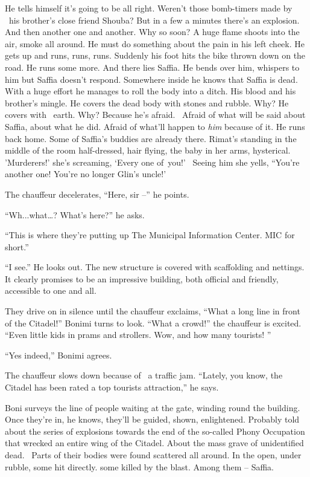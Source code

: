 \documentclass[twoside,11pt]{book}
\begin{document}
He tells himself it's going to be all right. Weren't those bomb-timers made by \ his brother's close friend Shouba? But
in a few a minutes there's an explosion. And then another one and another. Why so soon? A huge flame shoots into the
air, smoke all around. He must do something about the pain in his left cheek. He gets up and runs, runs, runs. Suddenly
his foot hits the bike thrown down on the road. He runs some more. And there lies Saffia. He bends over him, whispers
to him but Saffia doesn't respond. Somewhere inside he knows that Saffia is dead. With a huge effort he manages to roll
the body into a ditch. His blood and his brother's mingle{. }He covers the dead body with stones and
rubble. Why? He covers with \ earth. Why? Because he's afraid. ~Afraid of what will be said about Saffia, about what he
did. Afraid of what'll happen to \textit{him} because of it. He runs back home. Some of Saffia's buddies are already
there. Rimat's standing in the middle of the room half-dressed, hair flying, the baby in her arms, hysterical.
'Murderers!' she's screaming, `Every one of~you!' \ Seeing him she yells, ``You're another one! You're no
longer Glin's uncle!'

The chauffeur decelerates, ``Here, sir --'' he points.

``Wh...what{\dots}? What's here?'' he asks.

``This is where they're putting up The Municipal Information Center. MIC for short.''

``I see.'' He looks out. The new structure is covered with scaffolding and nettings.
It{ }clearly promises to be an impressive building, both official and friendly, accessible to one and
all.

They drive on in silence until the chauffeur exclaims, ``What a long line in front of the
Citadel!'' Bonimi turns to look. ``What a crowd!'' the chauffeur is excited.
``Even little kids in prams and strollers. Wow, and how many tourists! ''

``Yes indeed,'' Bonimi agrees.

The chauffeur slows down because of \ a traffic jam. ``Lately, you know, the Citadel has been rated a top
tourists attraction,'' he says.

Boni surveys the line of people waiting at the gate, winding round the building. Once they're in, he knows, they'll be
guided, shown, enlightened. Probably told about the series of explosions towards the end of the so-called Phony
Occupation that wrecked an entire wing of the Citadel. About the mass grave of unidentified dead. \ Parts of their
bodies were found scattered all around. In the open, under rubble, some hit directly. some killed by the blast. Among
them -- Saffia.
\end{document}
